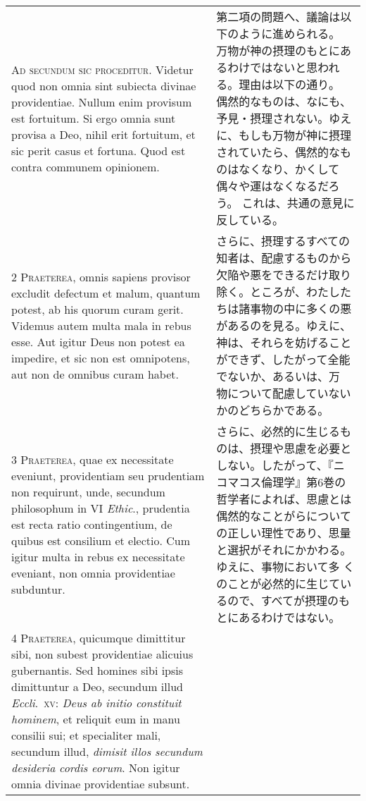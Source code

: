 \documentclass[10pt]{jsarticle} %
\begin{document}
\begin{longtable}{p{21em}p{21em}}

{\Huge A}{\scshape d secundum sic proceditur}. Videtur quod
non omnia sint subiecta divinae providentiae. Nullum enim provisum est
fortuitum. Si ergo omnia sunt provisa a Deo, nihil erit fortuitum, et
sic perit casus et fortuna. Quod est contra communem opinionem.

&


第二項の問題へ、議論は以下のように進められる。
万物が神の摂理のもとにあるわけではないと思われる。理由は以下の通り。
偶然的なものは、なにも、予見・摂理されない。ゆえに、もしも万物が神に摂理
 されていたら、偶然的なものはなくなり、かくして偶々や運はなくなるだろう。
 これは、共通の意見に反している。

\\


{\scshape 2 Praeterea}, omnis sapiens provisor excludit
defectum et malum, quantum potest, ab his quorum curam gerit. Videmus
autem multa mala in rebus esse. Aut igitur Deus non potest ea impedire,
et sic non est omnipotens, aut non de omnibus curam habet.

&


さらに、摂理するすべての知者は、配慮するものから欠陥や悪をできるだけ取り
 除く。ところが、わたしたちは諸事物の中に多くの悪があるのを見る。ゆえに、
 神は、それらを妨げることができず、したがって全能でないか、あるいは、万
 物について配慮していないかのどちらかである。

\\


{\scshape 3 Praeterea}, quae ex necessitate eveniunt,
providentiam seu prudentiam non requirunt, unde, secundum philosophum in
VI {\itshape Ethic}., prudentia est recta ratio contingentium, de quibus est
consilium et electio. Cum igitur multa in rebus ex necessitate eveniant,
non omnia providentiae subduntur.

&


さらに、必然的に生じるものは、摂理や思慮を必要としない。したがって、『ニ
 コマコス倫理学』第6巻の哲学者によれば、思慮とは偶然的なことがらについて
 の正しい理性であり、思量と選択がそれにかかわる。ゆえに、事物において多
 くのことが必然的に生じているので、すべてが摂理のもとにあるわけではない。

\\


{\scshape 4 Praeterea}, quicumque dimittitur sibi, non
subest providentiae alicuius gubernantis. Sed homines sibi ipsis
dimittuntur a Deo, secundum illud {\itshape Eccli}.~{\scshape xv}: {\itshape Deus ab initio constituit
hominem}, et reliquit eum in manu consilii sui; et specialiter mali,
secundum illud, {\itshape dimisit illos secundum desideria cordis eorum}. Non
igitur omnia divinae providentiae subsunt.


\end{longtable}
\end{document}

